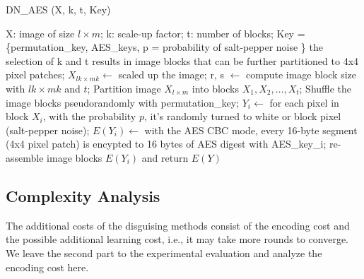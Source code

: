 \documentclass[conference]{IEEEtran}
\begin{document}
\begin{algorithm}
\caption{DN\_AES (X, k, t, Key)}\label{alg:aes}
\begin{algorithmic}[1]
\Require X: image of size $l \times m$; k: scale-up factor; t: number of blocks; Key = \{permutation\_key, AES\_keys, p = probability of salt-pepper noise \} 
\Ensure the selection of k and t results in image blocks that can be further partitioned to 4x4 pixel patches; 
\State $X_{lk \times mk} \leftarrow$ scaled up the image;
\State r, s $\leftarrow$ compute image block size with $lk \times mk$ and $t$;
\State Partition image $X_{l \times m}$ into blocks $X_1, X_2,\ldots, X_t$;
\State Shuffle the image blocks pseudorandomly with permutation\_key;
	\State $Y_i \leftarrow $ for each pixel in block $X_i$, with the probability $p$, it's randomly turned to white or block pixel (salt-pepper noise);
	\State $E(Y_i) \leftarrow $  with the AES CBC mode, every 16-byte segment (4x4 pixel patch) is encypted to 16 bytes of AES digest with AES\_key\_i;
\EndFor
\State re-assemble image blocks $E(Y_i)$ and return $E(Y)$
\end{algorithmic}
\end{algorithm}


\subsection{Complexity Analysis}\label{sec:complexity}
The additional costs of the disguising methods consist of the encoding cost and the possible additional learning cost, i.e., it may take more rounds to converge. We leave the second part to the experimental evaluation and analyze the encoding cost here. 
\end{document}
